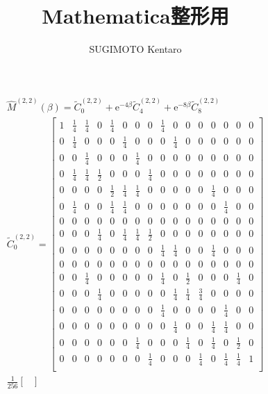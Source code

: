 \documentclass[10pt,a4paper]{jsarticle}
\author{SUGIMOTO Kentaro}
\title{Mathematica整形用}
\begin{document}
\begin{align}
\hat{M}^{(2,2)}(\beta)=\tilde{C}^{(2,2)}_{0} + \mathrm{e}^{-4\beta}\tilde{C}^{(2,2)}_{4} + \mathrm{e}^{-8\beta}\tilde{C}^{(2,2)}_{8}\\
\tilde{C}^{(2,2)}_{0} = \begin{bmatrix}
1 & \frac{1}{4} & \frac{1}{4} & 0 & \frac{1}{4} & 0 & 0 & 0 & \frac{1}{4} & 0 & 0 & 0 & 0 & 0 & 0 & 0 \\
0 & \frac{1}{4} & 0 & 0 & 0 & \frac{1}{4} & 0 & 0 & 0 & \frac{1}{4} & 0 & 0 & 0 & 0 & 0 & 0 \\
0 & 0 & \frac{1}{4} & 0 & 0 & 0 & \frac{1}{4} & 0 & 0 & 0 & 0 & 0 & 0 & 0 & 0 & 0 \\
0 & \frac{1}{4} & \frac{1}{4} & \frac{1}{2} & 0 & 0 & 0 & \frac{1}{4} & 0 & 0 & 0 & 0 & 0 & 0 & 0 & 0 \\
0 & 0 & 0 & 0 & \frac{1}{2} & \frac{1}{4} & \frac{1}{4} & 0 & 0 & 0 & 0 & 0 & \frac{1}{4} & 0 & 0 & 0 \\
0 & \frac{1}{4} & 0 & 0 & \frac{1}{4} & \frac{1}{4} & 0 & 0 & 0 & 0 & 0 & 0 & 0 & \frac{1}{4} & 0 & 0 \\
0 & 0 & 0 & 0 & 0 & 0 & 0 & 0 & 0 & 0 & 0 & 0 & 0 & 0 & 0 & 0 \\
0 & 0 & 0 & \frac{1}{4} & 0 & \frac{1}{4} & \frac{1}{4} & \frac{1}{2} & 0 & 0 & 0 & 0 & 0 & 0 & 0 & 0 \\
0 & 0 & 0 & 0 & 0 & 0 & 0 & 0 & \frac{1}{4} & \frac{1}{4} & 0 & 0 & \frac{1}{4} & 0 & 0 & 0 \\
0 & 0 & 0 & 0 & 0 & 0 & 0 & 0 & 0 & 0 & 0 & 0 & 0 & 0 & 0 & 0 \\
0 & 0 & \frac{1}{4} & 0 & 0 & 0 & 0 & 0 & \frac{1}{4} & 0 & \frac{1}{2} & 0 & 0 & 0 & \frac{1}{4} & 0 \\
0 & 0 & 0 & \frac{1}{4} & 0 & 0 & 0 & 0 & 0 & \frac{1}{4} & \frac{1}{4} & \frac{3}{4} & 0 & 0 & 0 & 0 \\
0 & 0 & 0 & 0 & 0 & 0 & 0 & 0 & \frac{1}{4} & 0 & 0 & 0 & 0 & \frac{1}{4} & 0 & 0 \\
0 & 0 & 0 & 0 & 0 & 0 & 0 & 0 & 0 & \frac{1}{4} & 0 & 0 & \frac{1}{4} & \frac{1}{4} & 0 & 0 \\
0 & 0 & 0 & 0 & 0 & 0 & \frac{1}{4} & 0 & 0 & 0 & \frac{1}{4} & 0 & \frac{1}{4} & 0 & \frac{1}{2} & 0 \\
0 & 0 & 0 & 0 & 0 & 0 & 0 & \frac{1}{4} & 0 & 0 & 0 & \frac{1}{4} & 0 & \frac{1}{4} & \frac{1}{4} & 1 \\
\end{bmatrix}\\
\frac{1}{256}\begin{bmatrix}

\end{bmatrix}
\end{align}
\end{document}
